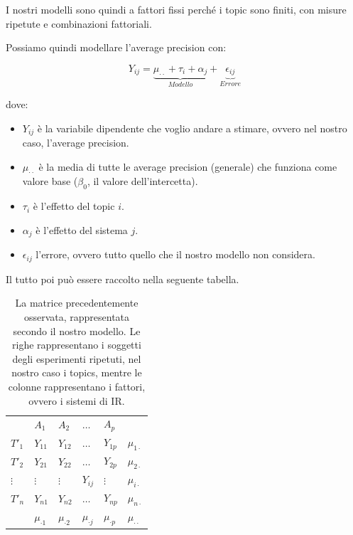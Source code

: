 I nostri modelli sono quindi a fattori fissi perché i topic sono finiti, con misure ripetute e combinazioni fattoriali.

Possiamo quindi modellare l'average precision con:

$$
Y_{ij} = \underbrace{\mu_{\cdot \cdot} + \tau_i + \alpha_j}_{Modello} + \underbrace{\epsilon_{ij}}_{Errore}
$$

\noindent dove:
\begin{itemize}
	\item $Y_{ij}$ è la variabile dipendente che voglio andare a stimare, ovvero nel nostro caso, l'average precision.
	\item $\mu_{\cdot\cdot}$ è la media di tutte le average precision (generale) che funziona come valore base ($\beta_0$, il valore dell'intercetta).
	\item $\tau_i$ è l'effetto del topic $i$.
	\item $\alpha_j$ è l'effetto del sistema $j$.
	\item $\epsilon_{ij}$ l'errore, ovvero tutto quello che il nostro modello non considera.
\end{itemize}

Il tutto poi può essere raccolto nella seguente tabella.

\begin{table}[htbp]
	\centering
	\begin{tabular}{llllll}
		\cline{2-5}
		\multicolumn{1}{l|}{}  & \multicolumn{1}{l|}{$ A_1 $} & \multicolumn{1}{l|}{$ A_2 $} & \multicolumn{1}{l|}{$ \ldots $} & \multicolumn{1}{l|}{$ A_p $} &  \\ \cline{1-5}
		\multicolumn{1}{|l|}{$ T'_1 $} & \multicolumn{1}{l|}{$ Y_{11} $} & \multicolumn{1}{l|}{$ Y_{12} $} & \multicolumn{1}{l|}{$ \ldots $} & \multicolumn{1}{l|}{$ Y_{1p} $} & $\mu_{1\cdot}$ \\ \cline{1-5}
		\multicolumn{1}{|l|}{$ T'_2 $} & \multicolumn{1}{l|}{$ Y_{21} $} & \multicolumn{1}{l|}{$ Y_{22} $} & \multicolumn{1}{l|}{$ \ldots $} & \multicolumn{1}{l|}{$ Y_{2p} $} & $\mu_{2\cdot}$ \\ \cline{1-5}
		\multicolumn{1}{|l|}{$\vdots$} & \multicolumn{1}{l|}{$\vdots$} 	 & \multicolumn{1}{l|}{$\vdots$}   & \multicolumn{1}{l|}{$ Y_{ij}$}  & \multicolumn{1}{l|}{$\vdots$}   & $\mu_{i\cdot}$ \\ \cline{1-5}
		\multicolumn{1}{|l|}{$ T'_n $} & \multicolumn{1}{l|}{$ Y_{n1} $} & \multicolumn{1}{l|}{$ Y_{n2} $} & \multicolumn{1}{l|}{$ \ldots $} & \multicolumn{1}{l|}{$ Y_{np} $} & $\mu_{n\cdot}$ \\ \cline{1-5}
		                               &      $\mu_{\cdot1}$             & $\mu_{\cdot2}$                  & $\mu_{\cdot j}$                 &   $\mu_{\cdot p}$               & $\mu_{\cdot\cdot}$
	\end{tabular}
	\caption{La matrice precedentemente osservata, rappresentata secondo il nostro modello. Le righe rappresentano i soggetti degli esperimenti ripetuti, nel nostro caso i topics, mentre le colonne rappresentano i fattori, ovvero i sistemi di IR.}
	\label{my-label}
\end{table}


